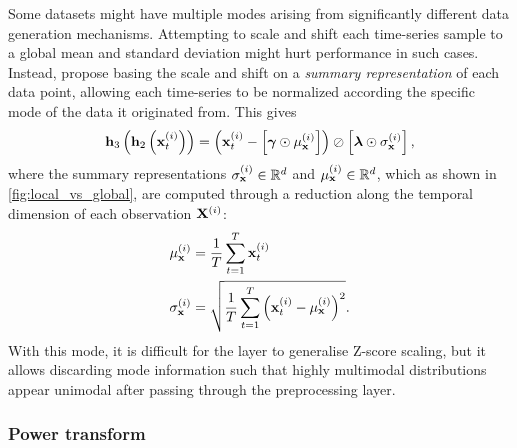 \documentclass{statsmsc}
\begin{document}
{Some datasets might have multiple modes arising from significantly different
data generation mechanisms. Attempting to scale and shift each time-series sample
to a global mean and
standard deviation might hurt performance in such cases. Instead, \cite{dain} propose
basing the scale and shift on a \textit{summary representation} of each data point, allowing
each time-series to be normalized according the specific mode of the data it originated from.
This gives
\begin{equation}
    \mathbf{h}_3\left(\mathbf{h}_2\left(\mathbf{x}_t^{(i)}\right)\right)=
    \left(\mathbf{x}_t^{(i)} - \left[\bm\gamma \odot \mu_{\mathbf{x}}^{(i)}\right]\right) \oslash \left[\bm\lambda \odot \sigma_{\mathbf{x}}^{(i)}\right],
\end{equation}
where the summary representations $\sigma_{\mathbf{x}}^{(i)} \in \mathbb{R}^d$ and $\mu_{\mathbf{x}}^{(i)} \in \mathbb{R}^d$,
which as shown in \cref{fig:local_vs_global},  are computed through a reduction
along the temporal dimension of each observation $\mathbf{X}^{(i)}$:
\begin{align}
    \mu_{\mathbf{x}}^{(i)}&=\frac{1}{T} \sum^{T}_{t=1} \mathbf{x}^{(i)}_t  \\
    \sigma_{\mathbf{x}}^{(i)}&=\sqrt{\frac{1}{T}  \sum^{T}_{t=1} \left(\mathbf{x}^{(i)}_t- \mu_{\mathbf{x}}^{(i)} \right)^2}.
\end{align}
With this mode, it is difficult for the layer to generalise Z-score scaling, but it allows
discarding mode information such that highly multimodal distributions appear unimodal after passing
through the preprocessing layer.


\subsubsection{Power transform}%
\label{ssub:Power transform}

}
\end{document}
